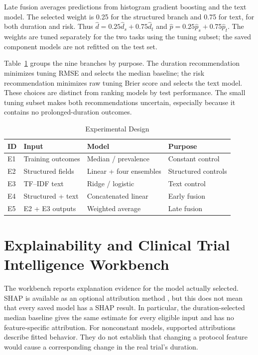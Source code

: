 \documentclass[10pt,letterpaper,twocolumn]{article}
\begin{document}
Late fusion averages predictions from histogram gradient boosting and the text model. The selected weight is 0.25 for the structured branch and 0.75 for text, for both duration and risk. Thus $\hat d=0.25\hat d_s+0.75\hat d_t$ and $\hat p=0.25\hat p_s+0.75\hat p_t$. The weights are tuned separately for the two tasks using the tuning subset; the saved component models are not refitted on the test set.

Table~\ref{tab:experiments} groups the nine branches by purpose. The duration recommendation minimizes tuning RMSE and selects the median baseline; the risk recommendation minimizes raw tuning Brier score and selects the text model. These choices are distinct from ranking models by test performance. The small tuning subset makes both recommendations uncertain, especially because it contains no prolonged-duration outcomes.

\begin{table}[!t]
\caption{Experimental Design}
\label{tab:experiments}
\centering
\footnotesize
\setlength{\tabcolsep}{3pt}
\renewcommand{\arraystretch}{1.25}
\begin{tabular}{|p{}|p{}|p{}|p{}|}
\hline
\textbf{ID} & \textbf{Input} & \textbf{Model} & \textbf{Purpose} \\
\hline
E1 & Training outcomes & Median / prevalence & Constant control \\
\hline
E2 & Structured fields & Linear + four ensembles & Structured controls \\
\hline
E3 & TF--IDF text & Ridge / logistic & Text control \\
\hline
E4 & Structured + text & Concatenated linear & Early fusion \\
\hline
E5 & E2 + E3 outputs & Weighted average & Late fusion \\
\hline
\end{tabular}
\end{table}

\section{Explainability and Clinical Trial Intelligence Workbench}

The workbench reports explanation evidence for the model actually selected. SHAP is available as an optional attribution method \cite{shap}, but this does not mean that every saved model has a SHAP result. In particular, the duration-selected median baseline gives the same estimate for every eligible input and has no feature-specific attribution. For nonconstant models, supported attributions describe fitted behavior. They do not establish that changing a protocol feature would cause a corresponding change in the real trial's duration.
\end{document}
